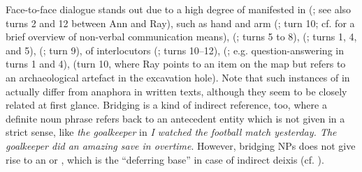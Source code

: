\documentclass[output=paper]{langsci/langscibook}
\begin{document}
{Face-to-face dialogue stands out due to a high degree of  manifested in  (\citet{Tomasello:1998}; see also turns 2 and 12 between Ann and Ray),  such as hand and arm  (\citet{Kendon:2004,McNeill:2000:a}; turn 10; cf.  for a brief overview of non-verbal communication means),  (\citealp{Ginzburg:Fernandez:Schlangen:2014}; turns 5 to 8),  (\citealp{Fernandez:Ginzburg:2002,Fernandez:Ginzburg:Lappin:2007}; turns 1, 4, and 5),  (\citealp{Ginzburg:Breitholz:Cooper:Hough:Tian:2015}; turn 9),  of interlocutors (\citealp{Clark:Schreuder:Buttrick:1983}; turns 10--12),  (\citealp{Sacks:Schegloff:Jefferson:1974,heldner2010,levinson2015}; e.g. question-answering in turns 1 and 4),  (turn 10, where Ray points to an item on the map but refers to an archaeological artefact in the excavation hole). Note that such instances of  \citep{Nunberg:1993} in  actually differ from  anaphora \citep{Clark:1975}  in written texts, although they seem to be closely related at first glance. Bridging is a kind of indirect reference, too, where a definite noun phrase refers back to an antecedent entity which is not given in a strict sense, like \textit{the goalkeeper} in \textit{I watched the football match yesterday. The goalkeeper did an amazing save in overtime}. However, bridging NPs does not give rise to an  or , which is the \enquote{deferring base} in case of indirect deixis (cf. \citealp{Luecking:2018:a}).

}
\end{document}
